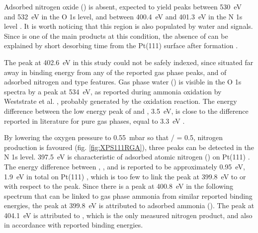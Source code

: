 Adsorbed nitrogen oxide () is absent, expected to yield peaks between \qty{530}{\eV} and \qty{532}{\eV} in the O 1s level, and between \qty{400.4}{\eV} and \qty{401.3}{\eV} in the N 1s level \parencite{Kiskinova1984, Zhu2003, Gunther2008}.
It is worth noticing that this region is also populated by water and  signals.
Since  is one of the main products at this condition, the absence of  can be explained by short desorbing time from the Pt(111) surface after formation \parencite{Ivashenko2021}.

The peak at \qty{402.6}{\eV} in this study could not be safely indexed, since situated far away in binding energy from any of the reported gas phase peaks, and of adsorbed nitrogen and  type features.
Gas phase water () is visible in the O 1s spectra by a peak at \qty{534}{\eV}, as reported during ammonia oxidation by Weststrate et al. \parencite*{Weststrate2006}, probably generated by the oxidation reaction.
The energy difference between the low energy peak of  and , \qty{3.5}{\eV}, is close to the difference reported in literature for pure gas phases, equal to \qty{3.3}{\eV} \parencite{Linford2019, Avval2022}.

By lowering the oxygen pressure to \qty{0.55}{\milli\bar} so that / = 0.5, nitrogen production is favoured (fig. \ref{fig:XPS111RGA}), three peaks can be detected in the N 1s level.
\qty{397.5}{\eV} is characteristic of adsorbed atomic nitrogen () on Pt(111) \parencite{vandenBroek1999, Zhu2003}.
The energy difference between , , and  is reported to be approximately \qty{0.95}{\eV}, \qty{1.9}{\eV} in total on Pt(111) \parencite{Ivashenko2021}, which is too few to link the peak at \qty{399.8}{\eV} to  or  with respect to the  peak.
Since there is a peak at \qty{400.8}{\eV} in the following spectrum that can be linked to gas phase ammonia from similar reported binding energies, the peak at \qty{399.8}{\eV} is attributed to adsorbed ammonia ().
The peak at \qty{404.1}{\eV} is attributed to , which is the only measured nitrogen product, and also in accordance with reported binding energies.


